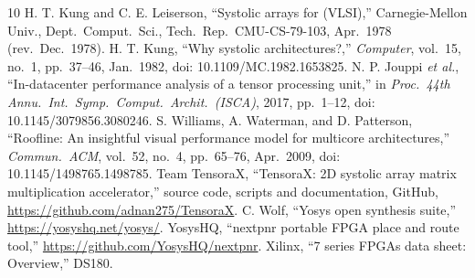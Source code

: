 \documentclass[conference]{IEEEtran}
\begin{document}
\begin{thebibliography}{10}
 H. T. Kung and C. E. Leiserson, ``Systolic arrays for (VLSI),'' Carnegie-Mellon Univ., Dept.\ Comput.\ Sci., Tech.\ Rep.\ CMU-CS-79-103, Apr.\ 1978 (rev.\ Dec.\ 1978).
 H. T. Kung, ``Why systolic architectures?,'' \emph{Computer}, vol.~15, no.~1, pp.~37--46, Jan.\ 1982, doi: 10.1109/MC.1982.1653825.
 N. P. Jouppi \emph{et al.}, ``In-datacenter performance analysis of a tensor processing unit,'' in \emph{Proc.\ 44th Annu.\ Int.\ Symp.\ Comput.\ Archit.\ (ISCA)}, 2017, pp.~1--12, doi: 10.1145/3079856.3080246.
 S. Williams, A. Waterman, and D. Patterson, ``Roofline: An insightful visual performance model for multicore architectures,'' \emph{Commun.\ ACM}, vol.~52, no.~4, pp.~65--76, Apr.\ 2009, doi: 10.1145/1498765.1498785.
 Team TensoraX, ``TensoraX: 2D systolic array matrix multiplication accelerator,'' source code, scripts and documentation, GitHub, \url{https://github.com/adnan275/TensoraX}.
 C. Wolf, ``Yosys open synthesis suite,'' \url{https://yosyshq.net/yosys/}.
 YosysHQ, ``nextpnr portable FPGA place and route tool,'' \url{https://github.com/YosysHQ/nextpnr}.
 Xilinx, ``7 series FPGAs data sheet: Overview,'' DS180.
\end{thebibliography}
\end{document}
